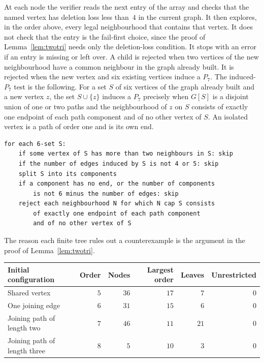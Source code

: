 \documentclass[ASNA]{USG}
\theoremstyle{WBstyletwo}
\numberwithin{equation}{section}
\begin{document}
At each node the verifier reads the next entry of the array and checks that the named vertex has deletion loss less than~$4$ in the current graph. It then explores, in the order above, every legal neighbourhood that contains that vertex. It does not check that the entry is the fail-first choice, since the proof of Lemma~\ref{lem:twotri} needs only the deletion-loss condition. It stops with an error if an entry is missing or left over. A child is rejected when two vertices of the new neighbourhood have a common neighbour in the graph already built. It is rejected when the new vertex and six existing vertices induce a $P_7$. The induced-$P_7$ test is the following. For a set $S$ of six vertices of the graph already built and a new vertex $z$, the set $S\cup\{z\}$ induces a $P_7$ precisely when $G[S]$ is a disjoint union of one or two paths and the neighbourhood of $z$ on $S$ consists of exactly one endpoint of each path component and of no other vertex of $S$. An isolated vertex is a path of order one and is its own end.

\begin{verbatim}
for each 6-set S:
    if some vertex of S has more than two neighbours in S: skip
    if the number of edges induced by S is not 4 or 5: skip
    split S into its components
    if a component has no end, or the number of components
        is not 6 minus the number of edges: skip
    reject each neighbourhood N for which N cap S consists
        of exactly one endpoint of each path component
        and of no other vertex of S
\end{verbatim}

The reason each finite tree rules out a counterexample is the argument in the proof of Lemma~\ref{lem:twotri}.

\begin{center}
\begin{tabular}{@{}lrrrrr@{}}
\toprule
Initial configuration & Order & Nodes & Largest order & Leaves & Unrestricted\\
\midrule
Shared vertex & $5$ & $36$ & $17$ & $7$ & $0$\\
One joining edge & $6$ & $31$ & $15$ & $6$ & $0$\\
Joining path of length two & $7$ & $46$ & $11$ & $21$ & $0$\\
Joining path of length three & $8$ & $5$ & $10$ & $3$ & $0$\\
\bottomrule
\end{tabular}
\end{center}
\end{document}
